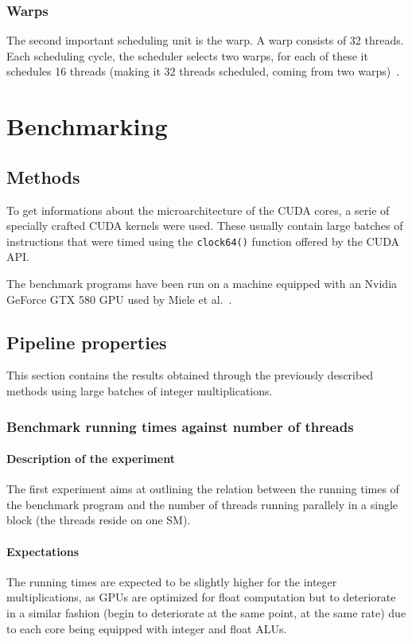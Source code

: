 \documentclass{report}
\begin{document}
        \subsection{Warps}
        The second important scheduling unit is the warp. A warp consists
        of 32 threads. Each scheduling cycle, the scheduler selects two
        warps, for each of these it schedules 16 threads (making it 32
        threads scheduled, coming from two warps)~\cite{cudaprog}.

\chapter{Benchmarking}

\section{Methods}
	To get informations about the microarchitecture of the CUDA cores, a serie 
    of specially crafted CUDA kernels were used. These usually contain large 
    batches of instructions that were timed using the \texttt{clock64()} 
    function offered by the CUDA API.

	The benchmark programs have been run on a machine equipped with an Nvidia
    GeForce GTX 580 GPU used by Miele et al.~\cite{cofact14}.

\section{Pipeline properties}
	This section contains the results obtained through the previously described
	methods using large batches of integer multiplications.

	\subsection{Benchmark running times against number of threads}
	\label{par:pipeline_exp}
	\subsubsection{Description of the experiment}
	The first experiment aims at outlining the relation between the running
    times of the benchmark program and the number of threads running parallely in
    a single block (the threads reside on one SM).
	\subsubsection{Expectations}
    The running times are expected to be slightly higher for the integer
    multiplications, as GPUs are optimized for float computation
    but to deteriorate in a similar fashion (begin to deteriorate
    at the same point, at the same rate) due to each core being equipped with
    integer and float ALUs.
    
\end{document}
